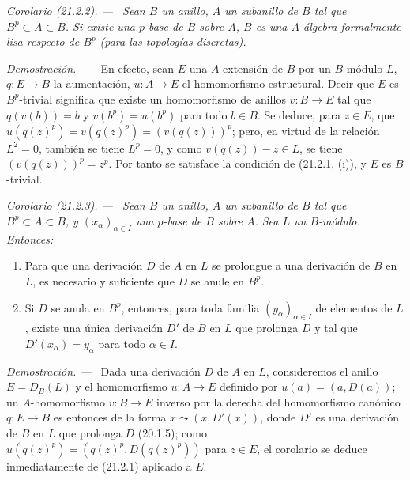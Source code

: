 \documentclass[10pt,oneside]{book}
\makeatletter
\newcommand{\setmanualcurrentlabel}[1]{\def\@currentlabel{#1}}
\newenvironment{corollary}[1][]{%
  \setmanualcurrentlabel{#1}\par\medskip\noindent\itshape Corolario (#1). ---\ }{\par}
\newenvironment{proof}{%
  \par\medskip\noindent\textit{Demostración. ---\ }}{\par}
\providecommand{\setmin}{-}%
\makeatother
\begin{document}
\begin{corollary}[21.2.2]
\label{0.21.2.2-es}
Sean $B$ un anillo, $A$ un subanillo de $B$ tal que $B^p\subset A\subset B$.
Si existe una $p$-base de $B$ sobre $A$, $B$ es una $A$-álgebra formalmente
lisa respecto de $B^p$ (para las topologías discretas).
\end{corollary}

\begin{proof}
En efecto, sean $E$ una $A$-extensión de $B$ por un $B$-módulo $L$, $q:E\to B$ la
aumentación, $u:A\to E$ el homomorfismo estructural. Decir que $E$ es
$B^p$-trivial significa que existe un homomorfismo de anillos $v:B\to E$
tal que $q(v(b))=b$ y $v(b^p)=u(b^p)$ para todo $b\in B$. Se deduce, para
$z\in E$, que $u(q(z)^p)=v(q(z)^p)=(v(q(z)))^p$; pero, en virtud de la
relación $L^2=0$, también se tiene $L^p=0$, y como $v(q(z))\setmin z\in L$, se
tiene $(v(q(z)))^p=z^p$. Por tanto se satisface la condición de (21.2.1, (i)), y $E$ es $B$-trivial.
\end{proof}

\begin{corollary}[21.2.3]
\label{0.21.2.3-es}
Sean $B$ un anillo, $A$ un subanillo de $B$ tal que $B^p\subset A\subset B$,
y $\left(x_\alpha\right)_{\alpha\in I}$ una $p$-base de $B$ sobre $A$. Sea
$L$ un $B$-módulo. Entonces:
\begin{enumerate}
  \item[\textup{(i)}] Para que una derivación $D$ de $A$ en $L$ se prolongue a una
  derivación de $B$ en $L$, es necesario y suficiente que $D$ se anule en
  $B^p$.
  \item[\textup{(ii)}] Si $D$ se anula en $B^p$, entonces, para toda familia
  $(y_\alpha)_{\alpha\in I}$ de elementos de $L$, existe una única derivación
  $D'$ de $B$ en $L$ que prolonga $D$ y tal que
  $D'(x_\alpha)=y_\alpha$ para todo $\alpha\in I$.
\end{enumerate}
\end{corollary}

\begin{proof}
Dada una derivación $D$ de $A$ en $L$, consideremos el anillo $E=D_B(L)$ y
el homomorfismo $u:A\to E$ definido por $u(a)=(a,D(a))$; un
$A$-homomorfismo $v:B\to E$ inverso por la derecha del homomorfismo canónico
$q:E\to B$ es entonces de la forma $x\leadsto(x,D'(x))$, donde $D'$ es una
derivación de $B$ en $L$ que prolonga $D$ (20.1.5); como
$u(q(z)^p)=(q(z)^p,D(q(z)^p))$ para $z\in E$, el corolario se deduce
inmediatamente de (21.2.1) aplicado a $E$.
\end{proof}
\end{document}
